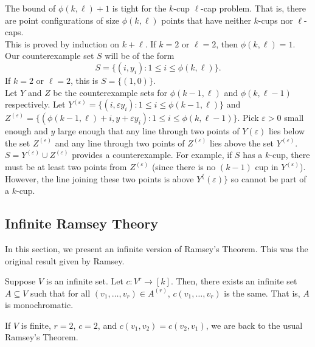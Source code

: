  	The bound of $\phi(k,\ell) + 1$ is tight for the $k$-cup $\ell$-cap problem. That is, there are point configurations of size $\phi(k,\ell)$ points that have neither $k$-cups nor $\ell$-caps.\\
 	This is proved by induction on $k+\ell$. If $k=2$ or $\ell=2$, then $\phi(k,\ell) = 1$. Our counterexample set $S$ will be of the form
 	\[ S = \{ (i,y_i) : 1 \le  i \le \phi(k,\ell) \}. \]
 	If $k=2$ or $\ell=2$, this is $S = \{ (1,0) \}$.\\
 	Let $Y$ and $Z$ be the counterexample sets for $\phi(k-1,\ell)$ and $\phi(k,\ell-1)$ respectively. Let $Y^{(\varepsilon)} = \{ (i,\varepsilon y_i) : 1 \le i \le \phi(k-1,\ell) \}$ and $Z^{(\varepsilon)} = \{ (\phi(k-1,\ell) + i,y + \varepsilon y_i) : 1 \le i \le \phi(k,\ell-1) \}$. Pick $\varepsilon > 0$ small enough and $y$ large enough that any line through two points of $Y{(\varepsilon)}$ lies below the set $Z^{(\varepsilon)}$ and any line through two points of $Z^{(\varepsilon)}$ lies above the set $Y^{(\varepsilon)}$.\\
 	$S = Y^{(\varepsilon)} \cup Z^{(\varepsilon)}$ provides a counterexample. For example, if $S$ has a $k$-cup, there must be at least two points from $Z^{(\varepsilon)}$ (since there is no $(k-1)$ cup in $Y^{(\varepsilon)}$). However, the line joining these two points is above $Y^\{(\varepsilon)\}$ so cannot be part of a $k$-cup.
		 
\subsection{Infinite Ramsey Theory}

	In this section, we present an infinite version of Ramsey's Theorem. This was the original result given by Ramsey.\\

	\begin{fdef}
		Suppose $V$ is an infinite set. Let $c : V^{r} \to [k]$. Then, there exists an infinite set $A \subseteq V$ such that for all $(v_1,\ldots,v_r) \in A^{(r)}$, $c(v_1,\ldots,v_r)$ is the same. That is, $A$ is monochromatic.
	\end{fdef}

	If $V$ is finite, $r=2$, $c=2$, and $c(v_1,v_2) = c(v_2,v_1)$, we are back to the usual Ramsey's Theorem.

